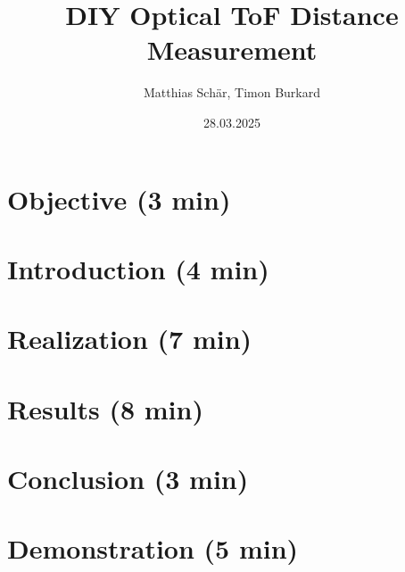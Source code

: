 \documentclass[aspectratio=169]{beamer}
\title{DIY Optical ToF Distance Measurement}
\author{Matthias Schär, Timon Burkard}
\institute{OST -- Ostschweizer Fachhochschule}
\date{28.03.2025}
\begin{document}




\section[Objective]{Objective (3 min)}


\section[Introduction]{Introduction (4 min)}


\section[Realization]{Realization (7 min)}


\section[Results]{Results (8 min)}


\section[Conclusion]{Conclusion (3 min)}


\section[Demonstration]{Demonstration (5 min)}



\miniframesoff

\questions{}


\end{document}
